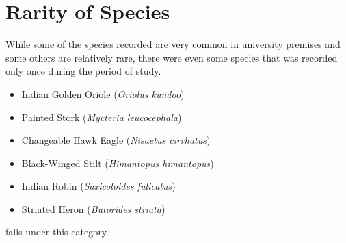 \section{Rarity of Species}
While some of the species recorded are very common in university premises and some others are relatively rare, there were even some species that was recorded only once during the period of study.
\begin{itemize}
    \item Indian Golden Oriole (\textit{Oriolus kundoo})
    \item Painted Stork (\textit{Mycteria leucocephala})
    \item Changeable Hawk Eagle (\textit{Nisaetus cirrhatus})
    \item Black-Winged Stilt (\textit{Himantopus himantopus})
    \item Indian Robin (\textit{Saxicoloides fulicatus})
    \item Striated Heron (\textit{Butorides striata})
\end{itemize}
falls under this category.
